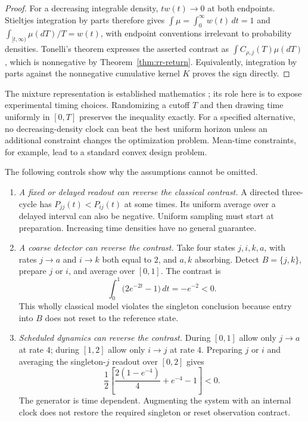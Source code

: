 \begin{proof}
For a decreasing integrable density, $t w(t)\to0$ at both endpoints.
Stieltjes integration by parts therefore gives
$\int\mu=\int_0^\infty w(t)\,dt=1$ and
$\int_{[t,\infty)}\mu(dT)/T=w(t)$, with endpoint conventions irrelevant to
probability densities.  Tonelli's theorem expresses the asserted contrast as
$\int C_{\rho,j}(T)\mu(dT)$, which is nonnegative by
Theorem~\ref{thm:rr-return}.  Equivalently, integration by parts against the
nonnegative cumulative kernel $K$ proves the sign directly.
\end{proof}

The mixture representation is established mathematics
\cite{rrPavlides2012}; its role here is to expose experimental timing choices.
Randomizing a cutoff $T$ and then drawing time uniformly in $[0,T]$ preserves
the inequality exactly.  For a specified alternative, no decreasing-density
clock can beat the best uniform horizon unless an additional constraint changes
the optimization problem.  Mean-time constraints, for example, lead to a
standard convex design problem.

The following controls show why the assumptions cannot be omitted.

\begin{enumerate}
\item \emph{A fixed or delayed readout can reverse the classical contrast.}
A directed three-cycle has $P_{jj}(t)<P_{ij}(t)$ at some times.  Its uniform
average over a delayed interval can also be negative.  Uniform sampling must
start at preparation.  Increasing time densities have no general guarantee.
\item \emph{A coarse detector can reverse the contrast.}
Take four states $j,i,k,a$, with rates $j\to a$ and $i\to k$ both equal to $2$,
and $a,k$ absorbing.  Detect $B=\{j,k\}$, prepare $j$ or $i$, and average over
$[0,1]$.  The contrast is
\[
 \int_0^1\bigl(2e^{-2t}-1\bigr)\,dt=-e^{-2}<0.
\]
This wholly classical model violates the singleton conclusion because entry
into $B$ does not reset to the reference state.
\item \emph{Scheduled dynamics can reverse the contrast.}
During $[0,1]$ allow only $j\to a$ at rate $4$; during $[1,2]$ allow only
$i\to j$ at rate $4$.  Preparing $j$ or $i$ and averaging the singleton-$j$
readout over $[0,2]$ gives
\[
 \frac12\left[\frac{2(1-e^{-4})}{4}+e^{-4}-1\right]<0.
\]
The generator is time dependent.  Augmenting the system with an internal clock
does not restore the required singleton or reset observation contract.
\end{enumerate}

